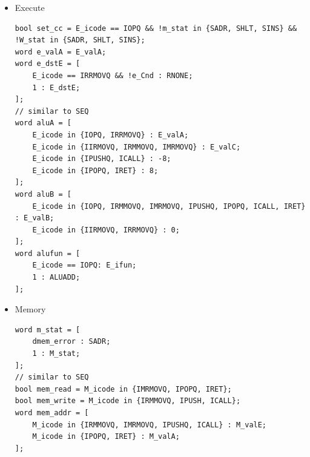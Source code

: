 \begin{itemize}
Precedence of forwarding sources:
\begin{itemize}
	\item Forward data affected by the nearest instruction. Thus E $>$ M $>$ W.
	\item For correct behavior of \texttt{popq \%rsp}, M $>$ E.
\end{itemize}
\begin{lstlisting}
word d_valA = [
	D_icode in {ICALL, IJXX} : D_valP;
	d_srcA == e_dstE : e_valE;
	d_srcA == M_dstM : m_valM;
	d_srcA == M_dstE : M_valE;
	d_srcA == W_dstM : W_valM;
	d_srcA == W_dstE : W_valE;
	1 : d_rvalA;
];
word d_valB = [
	d_srcB == e_dstE : e_valE;
	d_srcB == M_dstM : m_valM;
	d_srcB == M_dstE : M_valE;
	d_srcB == W_dstM : W_valM;
	d_srcB == W_dstE : W_valE;
	1 : d_rvalB;
];
word w_dstE = W_dstE;
word w_dstM = W_dstM;
word w_valE = W_valE;
word w_valM = W_valM;
word Stat = [
	W_stat = SBUB : SAOK;
	1 : W_stat;
];
// similar to SEQ
word d_srcA = [
	D_icode in {IOPQ, IRMMOVQ, IRRMOVQ, IPUSHQ} : D_rA;
	D_icode in {IRET, IPOPQ} : RRSP;
	1 : RNONE;
];
word d_srcB = [
	D_icode in {IOPQ, IRMMOVQ, IMRMOVQ} : D_rB;
	D_icode in {IPUSHQ, IPOPQ, ICALL, IRET} : RRSP;
	1 : RNONE;
];
word d_dstE = [
	D_icode in {IOPQ, IIRMOVQ} : rB;
	D_icode in {ICALL, IRET, IPUSHQ, IPOPQ} : RRSP;
	1 : RNONE;
];
word d_dstM = [
	D_icode = {IPOPQ, IMRMOVQ} : D_rA;
	1 : RNONE;
];
\end{lstlisting}
\item Execute
\begin{lstlisting}
bool set_cc = E_icode == IOPQ && !m_stat in {SADR, SHLT, SINS} && !W_stat in {SADR, SHLT, SINS};
word e_valA = E_valA;
word e_dstE = [
	E_icode == IRRMOVQ && !e_Cnd : RNONE;
	1 : E_dstE;
];
// similar to SEQ
word aluA = [
	E_icode in {IOPQ, IRRMOVQ} : E_valA;
	E_icode in {IIRMOVQ, IRMMOVQ, IMRMOVQ} : E_valC;
	E_icode in {IPUSHQ, ICALL} : -8;
	E_icode in {IPOPQ, IRET} : 8;
];
word aluB = [
	E_icode in {IOPQ, IRMMOVQ, IMRMOVQ, IPUSHQ, IPOPQ, ICALL, IRET} : E_valB;
	E_icode in {IIRMOVQ, IRRMOVQ} : 0;
];
word alufun = [
	E_icode == IOPQ: E_ifun;
	1 : ALUADD;
];
\end{lstlisting}
\item Memory
\begin{lstlisting}
word m_stat = [
	dmem_error : SADR;
	1 : M_stat;
];
// similar to SEQ
bool mem_read = M_icode in {IMRMOVQ, IPOPQ, IRET};
bool mem_write = M_icode in {IRMMOVQ, IPUSH, ICALL};
word mem_addr = [
	M_icode in {IRMMOVQ, IMRMOVQ, IPUSHQ, ICALL} : M_valE;
	M_icode in {IPOPQ, IRET} : M_valA;
];
\end{lstlisting}
\end{itemize}
